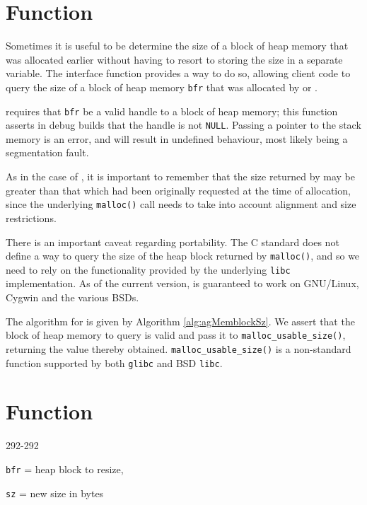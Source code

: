 %
%
\section{Function \agMemblockSz}
\label{sec:agMemblockSz}


Sometimes it is useful to be determine the size of a block of heap memory that
was allocated earlier without having to resort to storing the size in a separate
variable. The interface function \agMemblockSz provides a way to do so, allowing
client code to query the size of a block of heap memory \verb|bfr| that was 
allocated by \agMemblockNew or \agMemblockCopy. 

\agMemblockSz requires that \verb|bfr| be a valid handle to a block of heap 
memory; this function asserts in debug builds that the handle is not 
\verb|NULL|. Passing a pointer to the stack memory is an error, and will result 
in undefined behaviour, most likely being a segmentation fault.

As in the case of \agMemblockNew, it is important to remember that the size
returned by \agMemblockSz may be greater than that which had been originally
requested at the time of allocation, since the underlying \verb|malloc()| call
needs to take into account alignment and size restrictions.


There is an important caveat regarding portability. The C standard does not
define a way to query the size of the heap block returned by \verb|malloc()|,
and so we need to rely on the functionality provided by the underlying
\verb|libc| implementation. As of the current version, \agMemblockSz is
guaranteed to work on GNU/Linux, Cygwin and the various BSDs.

The algorithm for \agMemblockSz is given by Algorithm \ref{alg:agMemblockSz}. We
assert that the block of heap memory to query is valid and pass it to
\verb|malloc_usable_size()|, returning the value thereby obtained.
\verb|malloc_usable_size()| is a non-standard function supported by both
\verb|glibc| and BSD \verb|libc|.


%
%
\section{Function \agMemblockResize}
  {292-292}{\texttt{bfr} = heap block to resize,\par\texttt{sz} = new size in
  bytes}

